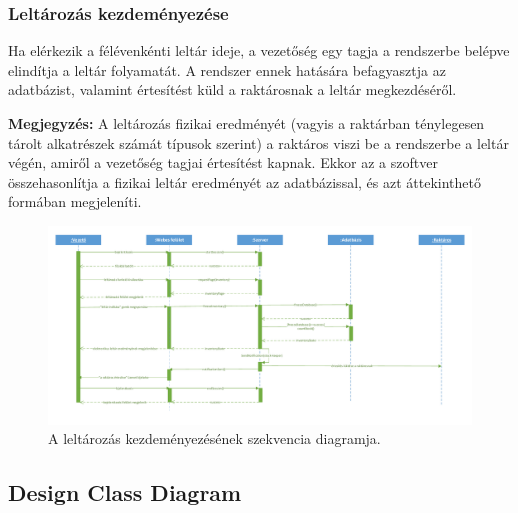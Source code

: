 \documentclass[12pt]{article}\usepackage[left=20mm,right=20mm,top=20mm,bottom=20mm]{geometry}
\begin{document}
\thispagestyle{empty}
\begin{landscape}
\subsubsection{Leltározás kezdeményezése}
Ha elérkezik a félévenkénti leltár ideje, a vezetőség egy tagja a rendszerbe belépve elindítja a leltár folyamatát. 
A rendszer ennek hatására befagyasztja az adatbázist, valamint értesítést küld a raktárosnak a leltár megkezdéséről. 

\noindent\textbf{Megjegyzés:} A leltározás fizikai eredményét (vagyis a raktárban ténylegesen tárolt alkatrészek számát típusok szerint) a raktáros viszi be a rendszerbe a leltár végén, amiről a vezetőség tagjai értesítést kapnak. 
Ekkor az a szoftver összehasonlítja a fizikai leltár eredményét az adatbázissal, és azt áttekinthető formában megjeleníti. 

\begin{figure}[!h]
    \centering
        \includegraphics[width=1.4\textwidth]{kepek/leltar_szekvencia.pdf}
        \caption{A leltározás kezdeményezésének szekvencia diagramja.}
\end{figure}
\end{landscape}

\subsection{Design Class Diagram}
\end{document}
